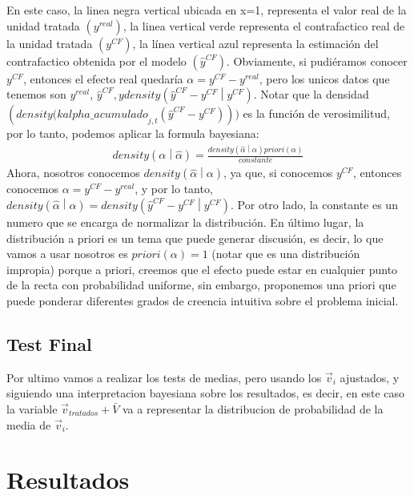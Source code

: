\documentclass[12pt]{article}
\begin{document}
En este caso, la linea negra vertical ubicada en x=1, representa el valor real de la unidad tratada {$ (y^{real}) $}, la linea vertical verde representa el contrafactico real de la unidad tratada {$ (y^{CF}) $}, la línea vertical azul representa la estimación del contrafactico obtenida por el modelo {$ ({\hat{y}}^{CF}) $}. Obviamente, si pudiéramos conocer {$y^{CF}$}, entonces el efecto real quedaría {$ \alpha=y^{CF}- y^{real} $}, pero los unicos datos que tenemos son {$ y^{real} $}, {$ {\hat{y}}^{CF}, y density\left({\hat{y}}^{CF}-y^{CF}\middle| y^{CF}\right) $}.  Notar que la densidad {$ ({density(kalpha\_acumulado}_{j,t}\left({\hat{y}}^{CF}-y^{CF}\right))) $} es la función de verosimilitud, por lo tanto, podemos aplicar la formula bayesiana:
\begin{align*}
    density\left(\alpha\middle|\hat{\alpha}\right)=\frac{density\left(\hat{\alpha}\middle|\alpha\right)priori(\alpha)}{constante}
\end{align*}
Ahora, nosotros conocemos  {$ density\left(\hat{\alpha}\middle|\alpha\right) $}, ya que, si conocemos  {$ y^{CF} $}, entonces conocemos  {$ \alpha=y^{CF}-y^{real} $}, y por lo tanto,  {$ density\left(\hat{\alpha}\middle|\alpha\right)=density\left({\hat{y}}^{CF}-y^{CF}\middle| y^{CF}\right) $}. Por otro lado, la constante es un numero que se encarga de normalizar la distribución.
En último lugar, la distribución a priori es un tema que puede generar discusión, es decir, lo que vamos a usar nosotros es {$ priori\left(\alpha\right)=1 $} (notar que es una distribución impropia) porque a priori, creemos que el efecto puede estar en cualquier punto de la recta con probabilidad uniforme, sin embargo, proponemos una priori que puede ponderar diferentes grados de creencia intuitiva sobre el problema inicial. 

\subsection{Test Final}

Por ultimo vamos a realizar los tests de medias, pero usando los {$ {\vec{v}}_i $} ajustados, y siguiendo una interpretacion bayesiana sobre los resultados, es decir, en este caso la variable {$ {\vec{v}}_{tratados}+\bar{V} $} va a representar la distribucion de probabilidad de la media de {$ {\vec{v}}_i $}.
\pagebreak
\section{Resultados}
\label{sec:Resultados}
\end{document}
